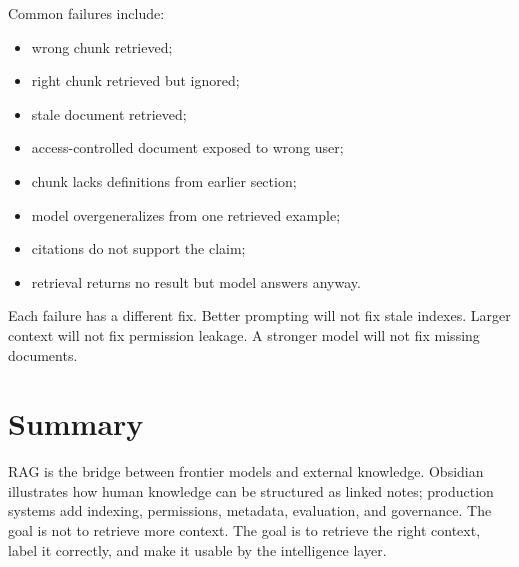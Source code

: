 Common failures include:

\begin{itemize}[leftmargin=*]
  \item wrong chunk retrieved;
  \item right chunk retrieved but ignored;
  \item stale document retrieved;
  \item access-controlled document exposed to wrong user;
  \item chunk lacks definitions from earlier section;
  \item model overgeneralizes from one retrieved example;
  \item citations do not support the claim;
  \item retrieval returns no result but model answers anyway.
\end{itemize}

Each failure has a different fix. Better prompting will not fix stale indexes. Larger context will not fix permission leakage. A stronger model will not fix missing documents.

\section{Summary}

RAG is the bridge between frontier models and external knowledge. Obsidian illustrates how human knowledge can be structured as linked notes; production systems add indexing, permissions, metadata, evaluation, and governance. The goal is not to retrieve more context. The goal is to retrieve the right context, label it correctly, and make it usable by the intelligence layer.
